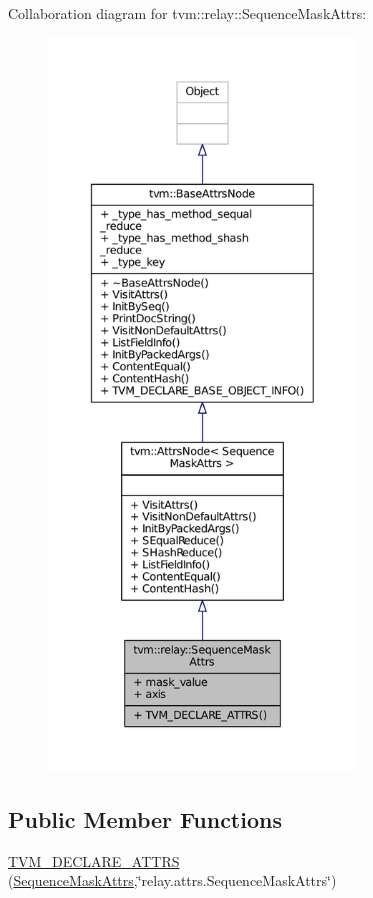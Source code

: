 Collaboration diagram for tvm\+:\+:relay\+:\+:Sequence\+Mask\+Attrs\+:
\nopagebreak
\begin{figure}[H]
\begin{center}
\leavevmode
\includegraphics[height=550pt]{structtvm_1_1relay_1_1SequenceMaskAttrs__coll__graph}
\end{center}
\end{figure}
\subsection*{Public Member Functions}
\begin{DoxyCompactItemize}
\item 
\hyperlink{structtvm_1_1relay_1_1SequenceMaskAttrs_a15f8fc5585e9bba5c2587963213681d4}{T\+V\+M\+\_\+\+D\+E\+C\+L\+A\+R\+E\+\_\+\+A\+T\+T\+RS} (\hyperlink{structtvm_1_1relay_1_1SequenceMaskAttrs}{Sequence\+Mask\+Attrs},\char`\"{}relay.\+attrs.\+Sequence\+Mask\+Attrs\char`\"{})
\end{DoxyCompactItemize}
